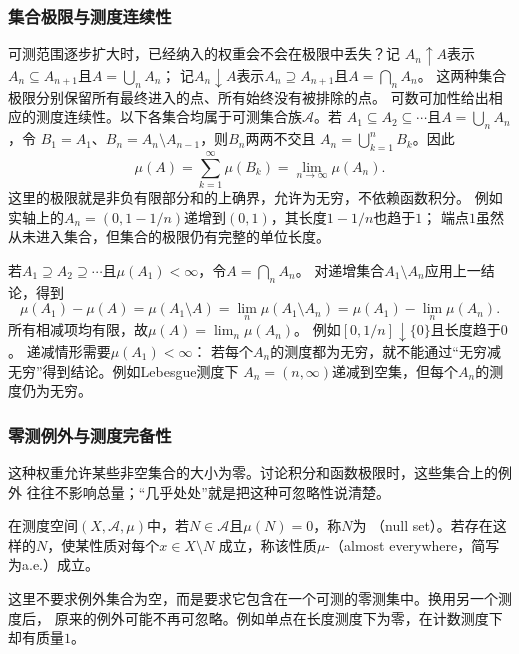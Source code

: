 \subsubsection{集合极限与测度连续性}
\label{sec:analysis-set-measure-continuity}
可测范围逐步扩大时，已经纳入的权重会不会在极限中丢失？记
$A_n\uparrow A$表示$A_n\subseteq A_{n+1}$且$A=\bigcup_nA_n$；
记$A_n\downarrow A$表示$A_n\supseteq A_{n+1}$且$A=\bigcap_nA_n$。
这两种集合极限分别保留所有最终进入的点、所有始终没有被排除的点。
可数可加性给出相应的测度连续性。以下各集合均属于可测集合族$\mathcal A$。若
$A_1\subseteq A_2\subseteq\cdots$且$A=\bigcup_nA_n$，令
$B_1=A_1$、$B_n=A_n\setminus A_{n-1}$，则$B_n$两两不交且
$A_n=\bigcup_{k=1}^nB_k$。因此
\[
  \mu(A)
  =
  \sum_{k=1}^{\infty}\mu(B_k)
  =
  \lim_{n\to\infty}\mu(A_n).
\]
这里的极限就是非负有限部分和的上确界，允许为无穷，不依赖函数积分。
例如实轴上的$A_n=(0,1-1/n)$递增到$(0,1)$，其长度$1-1/n$也趋于$1$；
端点$1$虽然从未进入集合，但集合的极限仍有完整的单位长度。

若$A_1\supseteq A_2\supseteq\cdots$且$\mu(A_1)<\infty$，令$A=\bigcap_nA_n$。
对递增集合$A_1\setminus A_n$应用上一结论，得到
\[
 \mu(A_1)-\mu(A)
 =\mu(A_1\setminus A)
 =\lim_n\mu(A_1\setminus A_n)
 =\mu(A_1)-\lim_n\mu(A_n).
\]
所有相减项均有限，故$\mu(A)=\lim_n\mu(A_n)$。
例如$[0,1/n]\downarrow\{0\}$且长度趋于$0$。
递减情形需要$\mu(A_1)<\infty$：
若每个$A_n$的测度都为无穷，就不能通过“无穷减无穷”得到结论。例如Lebesgue测度下
$A_n=(n,\infty)$递减到空集，但每个$A_n$的测度仍为无穷。

\subsubsection{零测例外与测度完备性}
这种权重允许某些非空集合的大小为零。讨论积分和函数极限时，这些集合上的例外
往往不影响总量；“几乎处处”就是把这种可忽略性说清楚。
\begin{definition}[零测集与几乎处处]
\label{def:analysis-null-set-almost-everywhere}
在测度空间$(X,\mathcal{A},\mu)$中，若$N\in\mathcal{A}$且$\mu(N)=0$，称$N$为
（null set）。若存在这样的$N$，使某性质对每个$x\in X\setminus N$
成立，称该性质$\mu$-（almost everywhere，简写为a.e.）成立。
\end{definition}
这里不要求例外集合为空，而是要求它包含在一个可测的零测集中。换用另一个测度后，
原来的例外可能不再可忽略。例如单点在长度测度下为零，在计数测度下却有质量$1$。

